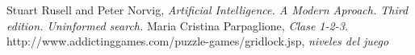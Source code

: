 \documentclass[10pt,journal,compsoc]{IEEEtran}
\begin{document}












%
%
%
\begin{thebibliography}{1}

Stuart Rusell and Peter Norvig, \emph{Artificial Intelligence. A Modern Aproach. Third edition. Uninformed search.}
Maria Cristina Parpaglione, \emph{Clase 1-2-3.}
http://www.addictinggames.com/puzzle-games/gridlock.jsp, \emph{niveles del juego}
\end{thebibliography}
\end{document}
